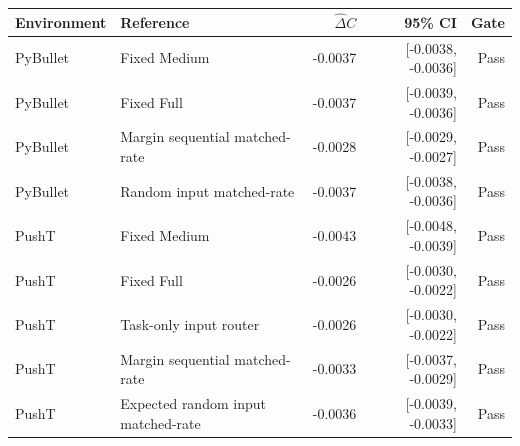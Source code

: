 \begin{tabular}{llrrr}
\toprule
Environment & Reference & $\widehat\Delta C$ & 95\% CI & Gate \\
\midrule
PyBullet & Fixed Medium & -0.0037 & [-0.0038, -0.0036] & Pass \\
PyBullet & Fixed Full & -0.0037 & [-0.0039, -0.0036] & Pass \\
PyBullet & Margin sequential matched-rate & -0.0028 & [-0.0029, -0.0027] & Pass \\
PyBullet & Random input matched-rate & -0.0037 & [-0.0038, -0.0036] & Pass \\
PushT & Fixed Medium & -0.0043 & [-0.0048, -0.0039] & Pass \\
PushT & Fixed Full & -0.0026 & [-0.0030, -0.0022] & Pass \\
PushT & Task-only input router & -0.0026 & [-0.0030, -0.0022] & Pass \\
PushT & Margin sequential matched-rate & -0.0033 & [-0.0037, -0.0029] & Pass \\
PushT & Expected random input matched-rate & -0.0036 & [-0.0039, -0.0033] & Pass \\
\bottomrule
\end{tabular}
